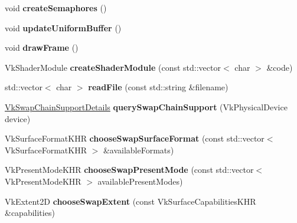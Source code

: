 \begin{DoxyCompactItemize}
void {\bfseries create\+Semaphores} ()
\item 
\mbox{\label{classflounder_1_1renderer_a4ede98176d377032f2659e05b80e1ed4}} 
void {\bfseries update\+Uniform\+Buffer} ()
\item 
\mbox{\label{classflounder_1_1renderer_a90bf6667243325c734a388d15333c83b}} 
void {\bfseries draw\+Frame} ()
\item 
\mbox{\label{classflounder_1_1renderer_a385496cacff3a8adbbddcb8786d2ab72}} 
Vk\+Shader\+Module {\bfseries create\+Shader\+Module} (const std\+::vector$<$ char $>$ \&code)
\item 
\mbox{\label{classflounder_1_1renderer_a10bfbb29171c090ff61a2266a572c379}} 
std\+::vector$<$ char $>$ {\bfseries read\+File} (const std\+::string \&filename)
\item 
\mbox{\label{classflounder_1_1renderer_a696c3fce14bb89644264edc625b1fb9f}} 
\hyperlink{structflounder_1_1_vk_swap_chain_support_details}{Vk\+Swap\+Chain\+Support\+Details} {\bfseries query\+Swap\+Chain\+Support} (Vk\+Physical\+Device device)
\item 
\mbox{\label{classflounder_1_1renderer_adf940787d8dfbce3945be4f69c654d19}} 
Vk\+Surface\+Format\+K\+HR {\bfseries choose\+Swap\+Surface\+Format} (const std\+::vector$<$ Vk\+Surface\+Format\+K\+HR $>$ \&available\+Formats)
\item 
\mbox{\label{classflounder_1_1renderer_a7184ccbca570a44ea5a44d5ed4cfc31c}} 
Vk\+Present\+Mode\+K\+HR {\bfseries choose\+Swap\+Present\+Mode} (const std\+::vector$<$ Vk\+Present\+Mode\+K\+HR $>$ available\+Present\+Modes)
\item 
\mbox{\label{classflounder_1_1renderer_a4962361e2b0ba2c2b155a2deaec86b30}} 
Vk\+Extent2D {\bfseries choose\+Swap\+Extent} (const Vk\+Surface\+Capabilities\+K\+HR \&capabilities)
\end{DoxyCompactItemize}
